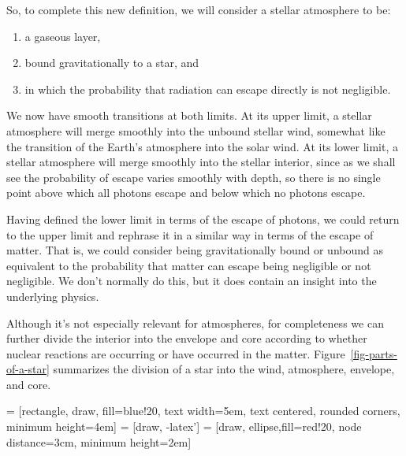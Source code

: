 So, to complete this new definition, we will consider a stellar atmosphere to be:
\begin{enumerate}
    \item a gaseous layer,
    \item bound gravitationally to a star, and
    \item in which the probability that radiation can escape directly is not negligible.
\end{enumerate}

We now have smooth transitions at both limits. At its upper limit, a stellar atmosphere will merge smoothly into the unbound stellar wind, somewhat like the transition of the Earth's atmosphere into the solar wind. At its lower limit, a stellar atmosphere will merge smoothly into the stellar interior, since as we shall see the probability of escape varies smoothly with depth, so there is no single point above which all photons escape and below which no photons escape. 

\newslide

Having defined the lower limit in terms of the escape of photons, we could return to the upper limit and rephrase it in a similar way in terms of the escape of matter. That is, we could consider being gravitationally bound or unbound as equivalent to the probability that matter can escape being negligible or not negligible. We don't normally do this, but it does contain an insight into the underlying physics.

\newslide

Although it's not especially relevant for atmospheres, for completeness we can further divide the interior into the envelope and core according to whether nuclear reactions are occurring or have occurred in the matter. Figure~\ref{fig-parts-of-a-star} summarizes the division of a star into the wind, atmosphere, envelope, and core.

 = [rectangle, draw, fill=blue!20, 
    text width=5em, text centered, rounded corners, minimum height=4em]
 = [draw, -latex']
 = [draw, ellipse,fill=red!20, node distance=3cm,
    minimum height=2em]
    
